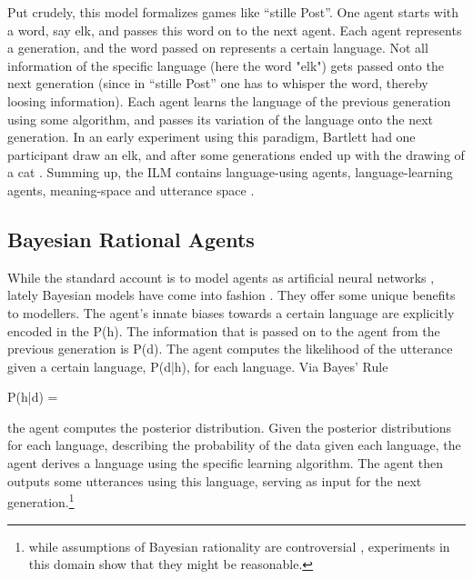 \documentclass[12pt]{scrartcl}
\renewenvironment{equation}{\vspace{5mm}\begin{oldequation}}{\end{oldequation}\vspace{5mm}}
\begin{document}
Put crudely, this model formalizes games like ``stille Post''. One agent starts with
a word, say elk, and passes this word on to the next agent. Each agent represents
a generation, and the word passed on represents a certain language. Not all information of
the specific language (here the word "elk") gets passed onto the next generation (since in
``stille Post'' one has to whisper the word, thereby loosing information). Each agent
learns the language of the previous generation using some algorithm, and passes its variation
of the language onto the next generation. In an early experiment using this paradigm, Bartlett
had one participant draw an elk, and after some generations ended up with the drawing of a cat \parencite{bartlett1932remembering}.
Summing up, the ILM contains language-using agents, language-learning agents, meaning-space and utterance space \parencite{kirby2002emergence}. 

\subsection*{Bayesian Rational Agents}

While the standard account is to model agents as artificial neural networks \parencite{kirby2002emergence}, lately Bayesian models have
come into fashion \parencite{perfors2011tutorial}. They offer some unique benefits to modellers.
The agent's innate biases towards a certain language are explicitly encoded in the P(h). The
information that is passed on to the agent from the previous generation is P(d). The agent
computes the likelihood of the utterance given a certain language, P(d|h), for each language. Via
Bayes' Rule

\begin{equation}
       P(h|d) = 
\end{equation}

the agent computes the posterior distribution. Given the posterior distributions for each language, describing the probability of the data given each language, the agent derives a language using the specific learning algorithm. The agent then
outputs some utterances using this language, serving as input for the next generation.\footnote{while assumptions of Bayesian rationality are controversial \parencite{marcus2013robust}, experiments in this domain \parencite{kalish2007iterated} show that they might be reasonable.}
\\
\end{document}
